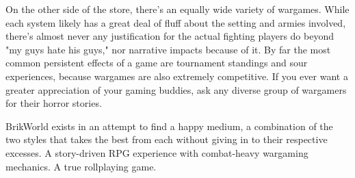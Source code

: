\documentclass[12pt,a4paper,twocolumn]{article}
\begin{document}
On the other side of the store, there's an equally wide variety of wargames.  While each system likely has a great deal of fluff about the setting and armies involved, there's almost never any justification for the actual fighting players do beyond "my guys hate his guys," nor narrative impacts because of it.  By far the most common persistent effects of a game are tournament standings and sour experiences, because wargames are also extremely competitive.  If you ever want a greater appreciation of your gaming buddies, ask any diverse group of wargamers for their horror stories.

BrikWorld exists in an attempt to find a happy medium, a combination of the two styles that takes the best from each without giving in to their respective excesses.  A story-driven RPG experience with combat-heavy wargaming mechanics.  A true rollplaying game.
\end{document}
